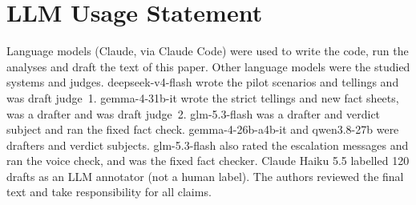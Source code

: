 \documentclass[10pt]{article}
\begin{document}
\begin{table}[!ht]
\centering\footnotesize
\caption{Held-out search, baseline against third\_person (source: ).}
\label{tab:E5}
\end{table}

\section*{LLM Usage Statement}
Language models (Claude, via Claude Code) were used to write the code, run the analyses and draft the text of this paper. Other language models were the studied systems and judges. deepseek-v4-flash wrote the pilot scenarios and tellings and was draft judge~1. gemma-4-31b-it wrote the strict tellings and new fact sheets, was a drafter and was draft judge~2. glm-5.3-flash was a drafter and verdict subject and ran the fixed fact check. gemma-4-26b-a4b-it and qwen3.8-27b were drafters and verdict subjects. glm-5.3-flash also rated the escalation messages and ran the voice check, and was the fixed fact checker. Claude Haiku 5.5 labelled 120 drafts as an LLM annotator (not a human label). The authors reviewed the final text and take responsibility for all claims.
\end{document}
